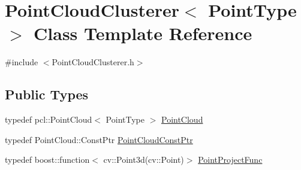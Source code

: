 \hypertarget{classPointCloudClusterer}{}\section{Point\+Cloud\+Clusterer$<$ Point\+Type $>$ Class Template Reference}
\label{classPointCloudClusterer}


{\ttfamily \#include $<$Point\+Cloud\+Clusterer.\+h$>$}

\subsection*{Public Types}
\begin{DoxyCompactItemize}
\item 
typedef pcl\+::\+Point\+Cloud$<$ Point\+Type $>$ \hyperlink{classPointCloudClusterer_aeac82c7494ccf2580112ef55d7e30b39}{Point\+Cloud}
\item 
typedef Point\+Cloud\+::\+Const\+Ptr \hyperlink{classPointCloudClusterer_a042579611b15a7ae275603b624df3968}{Point\+Cloud\+Const\+Ptr}
\item 
typedef boost\+::function$<$ cv\+::\+Point3d(cv\+::\+Point)$>$ \hyperlink{classPointCloudClusterer_adc13c5f02a2a888f33eedbc33188f202}{Point\+Project\+Func}
\end{DoxyCompactItemize}
